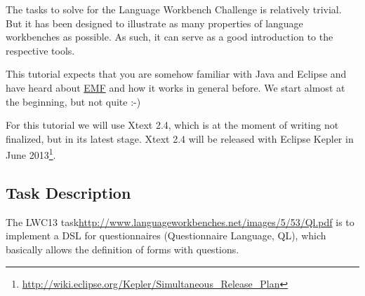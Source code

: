 The tasks to solve for the Language Workbench Challenge is relatively trivial.
But it has been designed to illustrate as many properties of language
workbenches as possible. As such, it can serve as a good introduction to the
respective tools.

This tutorial expects that you are somehow familiar with Java and Eclipse and
have heard about \url{EMF} and how it works in general before. We start almost at the
beginning, but not quite :-)

For this tutorial we will use Xtext 2.4, which is at the moment of writing not
finalized, but in its latest stage. Xtext 2.4 will be released with Eclipse
Kepler in June
2013\footnote{\url{http://wiki.eclipse.org/Kepler/Simultaneous_Release_Plan}}.


\subsection{Task Description}
The LWC13 task{\url{http://www.languageworkbenches.net/images/5/53/Ql.pdf}} is
to implement a DSL for questionnaires (Questionnaire Language, QL), which
basically allows the definition of forms with questions.  

